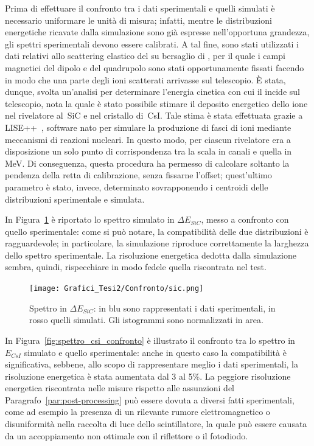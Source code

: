 Prima di effettuare il confronto tra i dati sperimentali e quelli simulati è necessario uniformare le unità di misura; infatti, mentre le distribuzioni energetiche ricavate dalla simulazione sono già espresse nell'opportuna grandezza, gli spettri sperimentali devono essere calibrati.
A tal fine, sono stati utilizzati i dati relativi allo scattering elastico del  su bersaglio di , per il quale i campi magnetici del dipolo e del quadrupolo sono stati opportunamente fissati facendo in modo che una parte degli ioni scatterati arrivasse sul telescopio.
È stata, dunque, svolta un'analisi per determinare l'energia cinetica con cui il  incide sul telescopio, nota la quale è stato possibile stimare il deposito energetico dello ione nel rivelatore al~SiC e nel cristallo di~CsI.
Tale stima è stata effettuata grazie a LISE++~\cite{tarasov:nimb08}, software nato per simulare la produzione di fasci di ioni mediante meccanismi di reazioni nucleari.
In questo modo, per ciascun rivelatore era a disposizione un solo punto di corrispondenza tra la scala in canali e quella in MeV.
Di conseguenza, questa procedura ha permesso di calcolare soltanto la pendenza della retta di calibrazione, senza fissarne l'offset; quest'ultimo parametro è stato, invece, determinato sovrapponendo i centroidi delle distribuzioni sperimentale e simulata.

In Figura~\ref{fig:spettro_sic_confronto} è riportato lo spettro simulato in $\Delta E_{SiC}$, messo a confronto con quello sperimentale: come si può notare, la compatibilità delle due distribuzioni è ragguardevole; in particolare, la simulazione riproduce correttamente la larghezza dello spettro sperimentale.
La risoluzione energetica dedotta dalla simulazione sembra, quindi, rispecchiare in modo fedele quella riscontrata nel test.
\begin{figure} [!p]
	\centering
	\texttt{[image: Grafici\_Tesi2/Confronto/sic.png]}
	\caption{Spettro in $\Delta E_{SiC}$: in blu sono rappresentati i dati sperimentali, in rosso quelli simulati. Gli istogrammi sono normalizzati in area.} \label{fig:spettro_sic_confronto}
\end{figure}

In Figura~\ref{fig:spettro_csi_confronto} è illustrato il confronto tra lo spettro in $E_{CsI}$ simulato e quello sperimentale: anche in questo caso la compatibilità è significativa, sebbene, allo scopo di rappresentare meglio i dati sperimentali, la risoluzione energetica è stata aumentata dal 3 al 5\%.
La peggiore risoluzione energetica riscontrata nelle misure rispetto alle assunzioni del Paragrafo~\ref{par:post-processing} può essere dovuta a diversi fatti sperimentali, come ad esempio la presenza di un rilevante rumore elettromagnetico o disuniformità nella raccolta di luce dello scintillatore, la quale può essere causata da un accoppiamento non ottimale con il riflettore o il fotodiodo.



